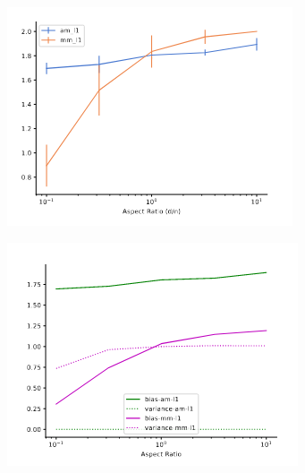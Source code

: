 \begin{figure}[t]
  \centering
  \begin{subfigure}[t]{0.24\linewidth}
    \centering
    \includegraphics[width=\columnwidth]{figures/estim_err_outlier1.png}
    \label{fig:estim_err_outlier1}
    \caption{}
  \end{subfigure}
  \hfill
  \begin{subfigure}[t]{0.24\linewidth}
    \centering
    \includegraphics[width=\columnwidth]{figures/bias_variance_outlier1.png}
    \label{fig:bias_variance_outlier1}
    \caption{}
  \end{subfigure}
  \hfill
  \begin{subfigure}[t]{0.24\linewidth}

\end{subfigure}
\end{figure}
